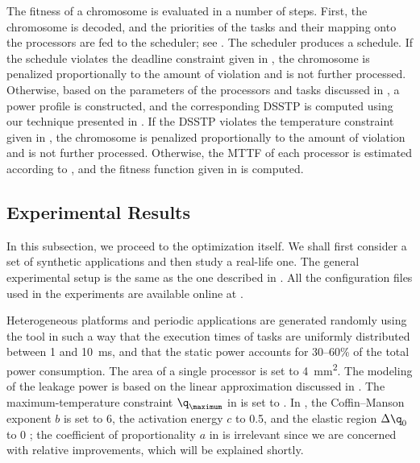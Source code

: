 The fitness of a chromosome is evaluated in a number of steps. First, the
chromosome is decoded, and the priorities of the tasks and their mapping onto
the processors are fed to the scheduler; see . The scheduler
produces a schedule. If the schedule violates the deadline constraint given in
, the chromosome is penalized proportionally
to the amount of violation and is not further processed. Otherwise, based on the
parameters of the processors and tasks discussed in , a power
profile \mp is constructed, and the corresponding \ac{DSSTP} \mq is computed
using our technique presented in . If the
\ac{DSSTP} violates the temperature constraint given in
, the chromosome is penalized proportionally
to the amount of violation and is not further processed. Otherwise, the
\ac{MTTF} of each processor is estimated according to
, and the fitness function given in
 is computed.

\subsection{Experimental Results}

In this subsection, we proceed to the optimization itself. We shall first
consider a set of synthetic applications and then study a real-life one. The
general experimental setup is the same as the one described in
. All the configuration files used in the
experiments are available online at \cite{eslab2011}.

Heterogeneous platforms and periodic applications are generated randomly using
the  tool \cite{dick1998} in such a way that the execution times of
tasks are uniformly distributed between 1 and 10~ms, and that the static power
accounts for 30--60\% of the total power consumption. The area of a single
processor is set to 4~mm\textsuperscript{2}. The modeling of the leakage power
is based on the linear approximation discussed in . The
maximum-temperature constraint $\q_\maximum$ in
 is set to . In
, the Coffin--Manson exponent $b$ is set to 6, the
activation energy $c$ to 0.5, and the elastic region $\Delta \q_0$ to 0
\cite{jedec2010}; the coefficient of proportionality $a$ in
 is irrelevant since we are concerned with
relative improvements, which will be explained shortly.

